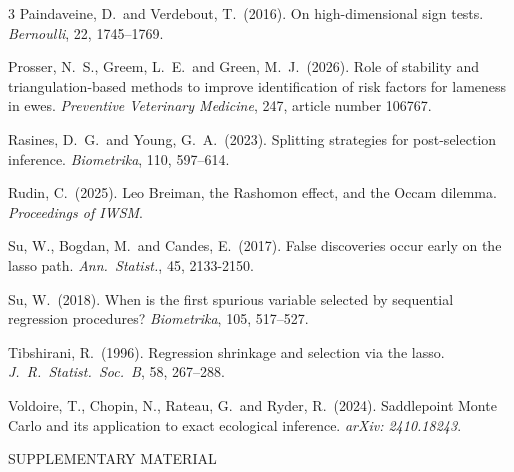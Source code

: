 \documentclass[10pt, reqno]{amsart}
\numberwithin{equation}{section}
\begin{document}
\begin{thebibliography}{3}
	Paindaveine, D.~and Verdebout, T.~(2016). On high-dimensional sign tests. \textit{Bernoulli}, 22, 1745--1769.
	
	Prosser, N.~S., Greem, L.~E.~and Green, M.~J.~(2026). Role of stability and triangulation-based methods to improve identification
	of risk factors for lameness in ewes. \textit{Preventive Veterinary Medicine}, 247, article number 106767.
	
	Rasines, D.~G.~and Young, G.~A.~(2023). Splitting strategies for post-selection inference. \emph{Biometrika}, 110, 597--614.
	
	Rudin, C.~(2025). Leo Breiman, the Rashomon effect, and the Occam dilemma. \emph{Proceedings of IWSM}.
	
	Su, W., Bogdan, M.~and Candes, E.~(2017). False discoveries occur early on the lasso path. \emph{Ann.~Statist.}, 45, 2133-2150.
	
	Su, W.~(2018). When is the first spurious variable selected by sequential regression procedures? \emph{Biometrika}, 105, 517--527.
	
	Tibshirani, R.~(1996). Regression shrinkage and selection via the lasso. \textit{J.~R.~Statist.~Soc.~B}, 58, 267--288.
	
	Voldoire, T., Chopin, N., Rateau, G.~and Ryder, R.~(2024). Saddlepoint Monte Carlo and its application to exact ecological inference. \emph{arXiv: 2410.18243}.
	
	
\end{thebibliography}



\newpage

{\centering

SUPPLEMENTARY MATERIAL

}
\end{document}
